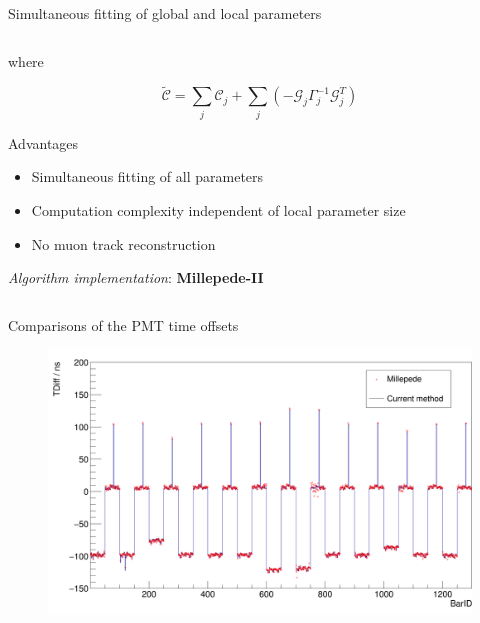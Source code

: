 \documentclass[compress, 13pt, aspectratio=169]{beamer}
\begin{document}
\begin{frame}[t,fragile]{Simultaneous fitting of global and local parameters}
\begin{columns}[t]
\begin{column}[t]{0.45\textwidth}
{				where
				\vspace*{-1em}

				$$\tilde{\mathcal{C}} = \sum_j \mathcal{C}_j + \sum_j \left(-\mathcal{G}_j \Gamma^{-1}_j \mathcal{G}^T_j \right)$$
			}
			\vspace*{-1em}

			\pause
			\begin{exampleblock} {Advantages}
				\small
				\begin{itemize}
					\item Simultaneous fitting of all parameters
					\item Computation complexity independent of local parameter size
					\item No muon track reconstruction
				\end{itemize}
			\end{exampleblock}
			\pause
			\textit{\small Algorithm implementation}: \large{\textbf{Millepede-II}}
		\end{column}
	\end{columns}

\end{frame}

\begin{frame}[t]{Comparisons of the PMT time offsets}
	\begin{figure}[t]
		\vspace*{-1em}
		\centering
		\includegraphics[height = 0.9 \textheight]{t_diff.png}
	\end{figure}
\end{frame}
\end{document}
